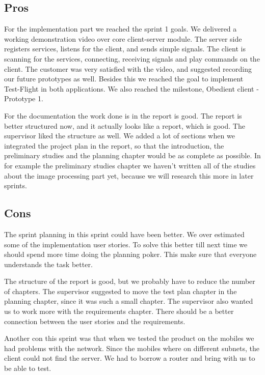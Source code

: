 \subsection{Pros}
For the implementation part we reached the sprint 1 goals. We delivered a working demonstration video over core client-server module. The server side registers services, listens for the client, and sends simple  signals. The client is scanning for the services, connecting, receiving signals and play commands on the client. The customer was very satisfied with the video, and suggested recording our future prototypes as well. Besides this we reached the goal to implement Test-Flight in both applications. We also reached the milestone, Obedient client - Prototype 1.

For the documentation the work done is in the report is good. The report is better structured now, and it actually looks like a report, which is good. The supervisor liked the structure as well. We added a lot of sections when we integrated the project plan in the report, so that the introduction, the preliminary studies and the planning chapter would be as complete as possible. In for example the preliminary studies chapter we haven't written all of the studies about the image processing part yet, because we will research this more in later sprints.

\subsection{Cons}
The sprint planning in this sprint could have been better. We over estimated some of the implementation user stories. To solve this better till next time we should spend more time doing the planning poker. This make sure that everyone understands the task better. 

The structure of the report is good, but we probably have to reduce the number of chapters. The supervisor suggested to move the test plan chapter in the planning chapter, since it was such a small chapter. The supervisor also wanted us to work more with the requirements chapter. There should be a better connection between the user stories and the requirements.


Another con this sprint was that when we tested the product on the mobiles we had problems with the network. Since the mobiles where on different subnets, the client could not find the server. We had to borrow a router and bring with us to be able to test. 